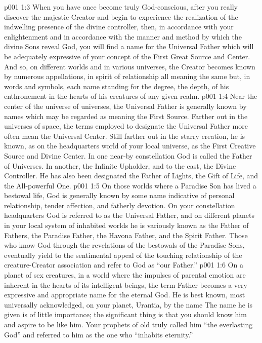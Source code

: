 \vs p001 1:3 When you have once become truly God\hyp{}conscious, after you really discover the majestic Creator and begin to experience the realization of the indwelling presence of the divine controller, then, in accordance with your enlightenment and in accordance with the manner and method by which the divine Sons reveal God, you will find a name for the Universal Father which will be adequately expressive of your concept of the First Great Source and Center. And so, on different worlds and in various universes, the Creator becomes known by numerous appellations, in spirit of relationship all meaning the same but, in words and symbols, each name standing for the degree, the depth, of his enthronement in the hearts of his creatures of any given realm.
\vs p001 1:4 \pc Near the center of the universe of universes, the Universal Father is generally known by names which may be regarded as meaning the First Source. Farther out in the universes of space, the terms employed to designate the Universal Father more often mean the Universal Center. Still farther out in the starry creation, he is known, as on the headquarters world of your local universe, as the First Creative Source and Divine Center. In one near\hyp{}by constellation God is called the Father of Universes. In another, the Infinite Upholder, and to the east, the Divine Controller. He has also been designated the Father of Lights, the Gift of Life, and the All\hyp{}powerful One.
\vs p001 1:5 On those worlds where a Paradise Son has lived a bestowal life, God is generally known by some name indicative of personal relationship, tender affection, and fatherly devotion. On your constellation headquarters God is referred to as the Universal Father, and on different planets in your local system of inhabited worlds he is variously known as the Father of Fathers, the Paradise Father, the Havona Father, and the Spirit Father. Those who know God through the revelations of the bestowals of the Paradise Sons, eventually yield to the sentimental appeal of the touching relationship of the creature\hyp{}Creator association and refer to God as “our Father.”
\vs p001 1:6 On a planet of sex creatures, in a world where the impulses of parental emotion are inherent in the hearts of its intelligent beings, the term Father becomes a very expressive and appropriate name for the eternal God. He is best known, most universally acknowledged, on your planet, Urantia, by the name  The name he is given is of little importance; the significant thing is that you should know him and aspire to be like him. Your prophets of old truly called him “the everlasting God” and referred to him as the one who “inhabits eternity.”
